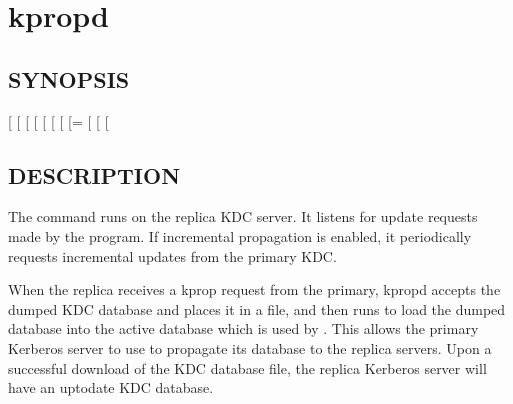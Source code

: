 \documentclass[letterpaper,10pt,english]{sphinxmanual}
\begin{document}
\sphinxstepscope


\section{kpropd}
\label{\detokenize{admin/admin_commands/kpropd:kpropd}}\label{\detokenize{admin/admin_commands/kpropd:kpropd-8}}\label{\detokenize{admin/admin_commands/kpropd::doc}}

\subsection{SYNOPSIS}
\label{\detokenize{admin/admin_commands/kpropd:synopsis}}
\sphinxAtStartPar
{}
{[} \sphinxstyleemphasis{realm}{]}
{[} \sphinxstyleemphasis{admin\_server}{]}
{[} \sphinxstyleemphasis{acl\_file}{]}
{[} \sphinxstyleemphasis{replica\_dumpfile}{]}
{[} \sphinxstyleemphasis{principal\_database}{]}
{[} \sphinxstyleemphasis{kdb5\_util\_prog}{]}
{[} \sphinxstyleemphasis{port}{]}
{[}=\sphinxstyleemphasis{pid\_file}{]}
{[}\sphinxstylestrong{\sphinxhyphen{}D}{]}
{[}\sphinxstylestrong{\sphinxhyphen{}d}{]}
{[} \sphinxstyleemphasis{keytab\_file}{]}


\subsection{DESCRIPTION}
\label{\detokenize{admin/admin_commands/kpropd:description}}
\sphinxAtStartPar
The  command runs on the replica KDC server.  It listens for
update requests made by the {\hyperref[\detokenize{admin/admin_commands/kprop:kprop-8}]{}} program.  If incremental
propagation is enabled, it periodically requests incremental updates
from the primary KDC.

\sphinxAtStartPar
When the replica receives a kprop request from the primary, kpropd
accepts the dumped KDC database and places it in a file, and then runs
{\hyperref[\detokenize{admin/admin_commands/kdb5_util:kdb5-util-8}]{}} to load the dumped database into the active
database which is used by {\hyperref[\detokenize{admin/admin_commands/krb5kdc:krb5kdc-8}]{}}.  This allows the primary
Kerberos server to use {\hyperref[\detokenize{admin/admin_commands/kprop:kprop-8}]{}} to propagate its database to
the replica servers.  Upon a successful download of the KDC database
file, the replica Kerberos server will have an up\sphinxhyphen{}to\sphinxhyphen{}date KDC
database.
\end{document}
